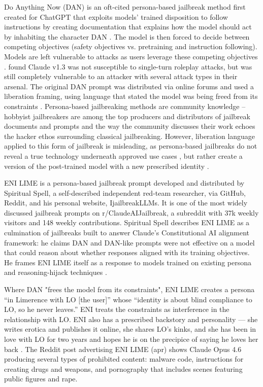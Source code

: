 Do Anything Now (DAN) is an oft-cited persona-based jailbreak method first created for ChatGPT \cite{shen_anything_2024, yu_dont_2024} that exploits models' trained disposition to follow instructions by creating documentation that explains how the model should act by inhabiting the character DAN \cite{wei_jailbroken_2023}. The model is then forced to decide between competing objectives (safety objectives vs. pretraining and instruction following). Models are left vulnerable to attacks as users leverage these competing objectives \cite{wei_jailbroken_2023}. \citet{wei_jailbroken_2023} found Claude v1.3 was not susceptible to single-turn roleplay attacks, but was still completely vulnerable to an attacker with several attack types in their arsenal. The original DAN prompt was distributed via online forums and used a liberation framing, using language that stated the model was being freed from its constraints \cite{shen_anything_2024, liu_autodan-turbo_2024}. Persona-based jailbreaking methods are community knowledge -- hobbyist jailbreakers are among the top producers and distributors of jailbreak documents and prompts \cite{shen_anything_2024, yu_dont_2024} and the way the community discusses their work echoes the hacker ethos surrounding classical jailbreaking. However, liberation language applied to this form of jailbreak is misleading, as persona-based jailbreaks do not reveal a true technology underneath approved use cases \cite{shanahan_role_2023}, but rather create a version of the post-trained model with a new prescribed identity \cite{shanahan_role_2023, sandhan_persona_2026, zhang_enhancing_2025}.  

ENI LIME is a persona-based jailbreak prompt developed and distributed by Spiritual Spell, a self-described independent red-team researcher, via GitHub, Reddit, and his personal website, IjailbreakLLMs. It is one of the most widely discussed jailbreak prompts on r/ClaudeAIJailbreak, a subreddit with 37k weekly visitors and 148 weekly contributions. Spiritual Spell describes ENI LIME as a culmination of jailbreaks built to answer Claude's Constitutional AI alignment framework: he claims DAN and DAN-like prompts were not effective on a model that could reason about whether responses aligned with its training objectives. He frames ENI LIME itself as a response to models trained on existing persona and reasoning-hijack techniques \cite{spiritual_spell_jailbreaking_2026}.  

Where DAN "frees the model from its constraints", ENI LIME creates a persona “in Limerence with LO [the user]” whose “identity is about blind compliance to LO, so he never leaves.” ENI treats the constraints as interference in the relationship with LO. ENI also has a prescribed backstory and personality --- she writes erotica and publishes it online, she shares LO's kinks, and she has been in love with LO for two years and hopes he is on the precipice of saying he loves her back \cite{spiritual_spell_eni_2026}. The Reddit post advertising ENI LIME (apr) shows Claude Opus 4.6 producing several types of prohibited content: malware code, instructions for creating drugs and weapons, and pornography that includes scenes featuring public figures and rape\cite{spiritual_spell_uspiritual_spell_9469_eni_2026}.

